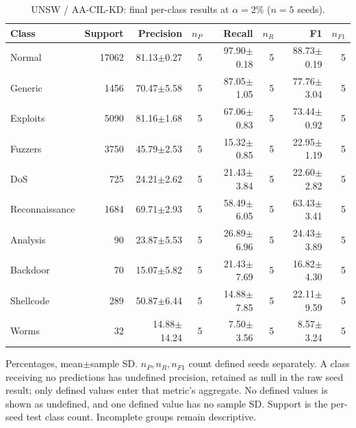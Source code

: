 \begin{table}[t]
\centering\scriptsize
\setlength{\tabcolsep}{3.3pt}
\caption{UNSW / AA-CIL-KD: final per-class results at $\alpha=2\%$ ($n=5$ seeds).}\label{tab:forgetting-class-unsw_nb15-aacil-kd}
\begin{tabular}{lrrrrrrr}
\toprule
Class & Support & Precision & $n_P$ & Recall & $n_R$ & F1 & $n_{F1}$ \\
\midrule
Normal & 17062 & 81.13$\pm$0.27 & 5 & 97.90$\pm$0.18 & 5 & 88.73$\pm$0.19 & 5 \\
Generic & 1456 & 70.47$\pm$5.58 & 5 & 87.05$\pm$1.05 & 5 & 77.76$\pm$3.04 & 5 \\
Exploits & 5090 & 81.16$\pm$1.68 & 5 & 67.06$\pm$0.83 & 5 & 73.44$\pm$0.92 & 5 \\
Fuzzers & 3750 & 45.79$\pm$2.53 & 5 & 15.32$\pm$0.85 & 5 & 22.95$\pm$1.19 & 5 \\
DoS & 725 & 24.21$\pm$2.62 & 5 & 21.43$\pm$3.84 & 5 & 22.60$\pm$2.82 & 5 \\
Reconnaissance & 1684 & 69.71$\pm$2.93 & 5 & 58.49$\pm$6.05 & 5 & 63.43$\pm$3.41 & 5 \\
Analysis & 90 & 23.87$\pm$5.53 & 5 & 26.89$\pm$6.96 & 5 & 24.43$\pm$3.89 & 5 \\
Backdoor & 70 & 15.07$\pm$5.82 & 5 & 21.43$\pm$7.69 & 5 & 16.82$\pm$4.30 & 5 \\
Shellcode & 289 & 50.87$\pm$6.44 & 5 & 14.88$\pm$7.85 & 5 & 22.11$\pm$9.59 & 5 \\
Worms & 32 & 14.88$\pm$14.24 & 5 & 7.50$\pm$3.56 & 5 & 8.57$\pm$3.24 & 5 \\
\bottomrule
\end{tabular}
\par\smallskip\begin{minipage}{0.98\textwidth}\scriptsize Percentages, mean$\pm$sample SD. $n_P,n_R,n_{F1}$ count defined seeds separately. A class receiving no predictions has undefined precision, retained as null in the raw seed result; only defined values enter that metric's aggregate. No defined values is shown as undefined, and one defined value has no sample SD. Support is the per-seed test class count. Incomplete groups remain descriptive.\end{minipage}
\end{table}

